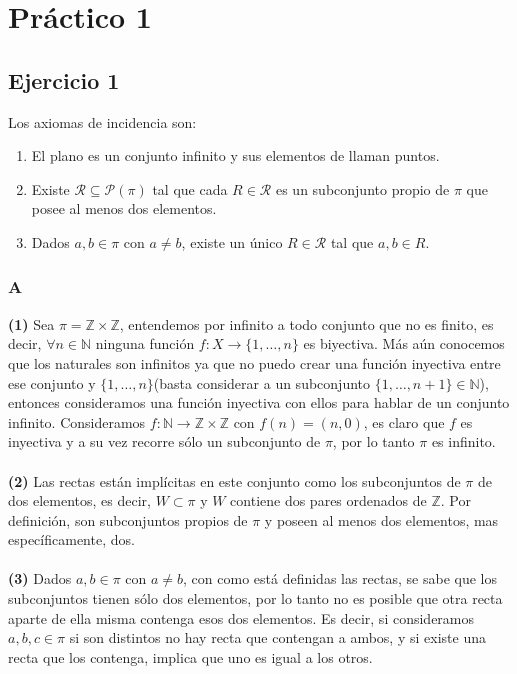 \documentclass[a4paper]{article}
\begin{document}
\section{Práctico 1}
\subsection{Ejercicio 1}
Los axiomas de incidencia son:
\begin{enumerate}
    \item El plano es un conjunto infinito y sus elementos de llaman puntos.
    \item Existe $\mathcal{R} \subseteq \mathcal{P} (\pi)$ tal que cada $R \in \mathcal{R}$ es un subconjunto propio de $\pi$ que posee al menos dos elementos.
    \item Dados $a,b \in \pi$ con $a \neq b$, existe un único $R \in \mathcal{R}$ tal que $a,b \in R$.  
\end{enumerate}
\subsubsection{A}
\textbf{(1)} Sea $\pi = \mathbb{Z} \times \mathbb{Z}$, entendemos por infinito a todo conjunto que no es finito, es decir, $\forall n \in \mathbb{N}$ ninguna función $f:X\rightarrow \{1,\dots ,n\}$ es biyectiva. Más aún conocemos que los naturales son infinitos ya que no puedo crear una función inyectiva entre ese conjunto y $\{1,\dots,n\}$(basta considerar a un subconjunto $\{1,\dots,n+1\}\in \mathbb{N}$), entonces consideramos una función inyectiva con ellos para hablar de un conjunto infinito. Consideramos $f:\mathbb{N}\rightarrow\mathbb{Z} \times \mathbb{Z}$ con $f(n)=(n,0)$, es claro que $f$ es inyectiva y a su vez recorre sólo un subconjunto de $\pi$, por lo tanto $\pi$ es infinito.\\\\
\textbf{(2)} Las rectas están implícitas en este conjunto como los subconjuntos de $\pi$ de dos elementos, es decir, $W\subset \pi$ y $W$ contiene dos pares ordenados de $\mathbb{Z}$. Por definición, son subconjuntos propios de $\pi$ y poseen al menos dos elementos, mas específicamente, dos.\\\\
\textbf{(3)} Dados $a,b \in \pi$ con $a\neq b$, con como está definidas las rectas, se sabe que los subconjuntos tienen sólo dos elementos, por lo tanto no es posible que otra recta aparte de ella misma contenga esos dos elementos. Es decir, si consideramos $a,b,c \in \pi$ si son distintos no hay recta que contengan a ambos, y si existe una recta que los contenga, implica que uno es igual a los otros.
\end{document}

